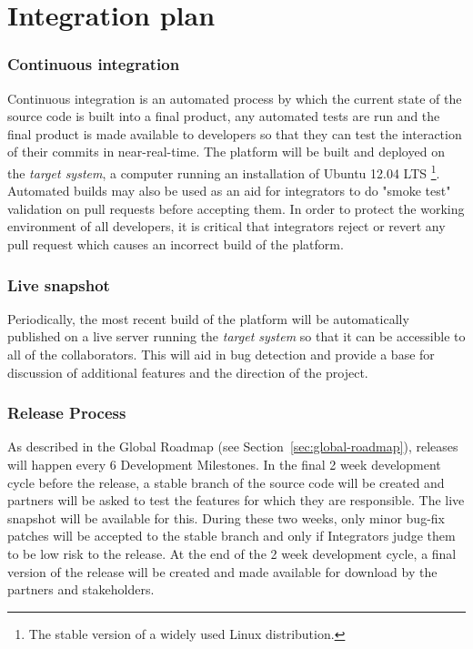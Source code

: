\chapter{Integration plan}
\label{ch:integration-plan}

\subsection{Continuous integration}
\label{sec:continuous-integration}

Continuous integration is an automated process by which the current state of the source code is
built into a final product, any automated tests are run and the final product is made available
to developers so that they can test the interaction of their commits in near-real-time. The platform
will be built and deployed on the \emph{target system}, a computer running an installation of
Ubuntu 12.04 LTS \footnote{The stable version of a widely used Linux distribution.}.
Automated builds may also be used as an aid for integrators to do "smoke test" validation on pull
requests before accepting them. In order to protect the working environment of all developers,
it is critical that integrators reject or revert any pull request which causes an incorrect build
of the platform.

\subsection{Live snapshot}
\label{sec:live-snapshot}

Periodically, the most recent build of the \learnpad platform will be automatically published
on a live server running the \emph{target system} so that it can be accessible to all of the
collaborators. This will aid in bug detection and provide a base for discussion of additional
features and the direction of the project.

\subsection{Release Process}
\label{sec:release-process}

As described in the Global Roadmap (see Section~\ref{sec:global-roadmap}), releases will happen
every 6 Development Milestones. In the final 2 week development cycle before the release, a stable
branch of the source code will be created and partners will be asked to test the features for
which they are responsible. The live snapshot will be available for this. During these two weeks,
only minor bug-fix patches will be accepted to the stable branch and only if Integrators judge them
to be low risk to the release. At the end of the 2 week development cycle, a final version of the
release will be created and made available for download by the partners and stakeholders.
